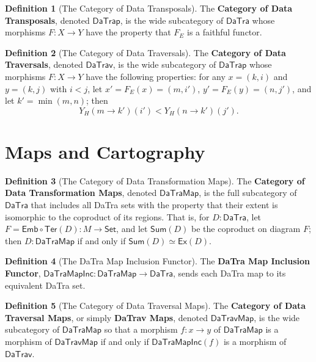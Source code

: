 \documentclass[11pt]{article}
\theoremstyle{definition}
\newtheorem{definition}{Definition}[section]
\theoremstyle{plain}
\newcommand{\Set}{\mathsf{Set}}
\begin{document}
\begin{definition}[The Category of Data Transposals]
The \textbf{Category of Data Transposals}, denoted $\mathsf{DaTrap}$, is the
wide subcategory of $\mathsf{DaTra}$ whose morphisms $F : X \to Y$ have the
property that $F_E$ is a faithful functor.
\end{definition}

\begin{definition}[The Category of Data Traversals]
The \textbf{Category of Data Traversals}, denoted $\mathsf{DaTrav}$, is the
wide subcategory of $\mathsf{DaTrap}$ whose morphisms $F : X \to Y$ have the
following properties: for any $x=(k,i)$ and $y=(k,j)$ with $i<j$, let
$x'=F_E(x)=(m,i')$, $y'=F_E(y)=(n,j')$, and let
$k'=\min(m,n)$; then
\[
  Y_H(m \to k')(i') < Y_H(n \to k')(j').
\]
\end{definition}

\section{Maps and Cartography}

\begin{definition}[The Category of Data Transformation Maps]
The \textbf{Category of Data Transformation Maps}, denoted
$\mathsf{DaTraMap}$, is the full subcategory of $\mathsf{DaTra}$ that includes
all DaTra sets with the property that their extent is isomorphic to the
coproduct of its regions. That is, for $D : \mathsf{DaTra}$, let
$F = \mathsf{Emb} \circ \mathsf{Ter}(D) : M \to \Set$, and let
$\mathsf{Sum}(D)$ be the coproduct on diagram $F$; then
$D : \mathsf{DaTraMap}$ if and only if
$\mathsf{Sum}(D) \simeq \mathsf{Ex}(D)$.
\end{definition}

\begin{definition}[The DaTra Map Inclusion Functor]
The \textbf{DaTra Map Inclusion Functor},
$\mathsf{DaTraMapInc} : \mathsf{DaTraMap} \to \mathsf{DaTra}$, sends each
DaTra map to its equivalent DaTra set.
\end{definition}

\begin{definition}[The Category of Data Traversal Maps]
The \textbf{Category of Data Traversal Maps}, or simply \textbf{DaTrav Maps},
denoted $\mathsf{DaTravMap}$, is the wide subcategory of
$\mathsf{DaTraMap}$ so that a morphism $f : x \to y$ of $\mathsf{DaTraMap}$
is a morphism of $\mathsf{DaTravMap}$ if and only if
$\mathsf{DaTraMapInc}(f)$ is a morphism of $\mathsf{DaTrav}$.
\end{definition}
\end{document}
